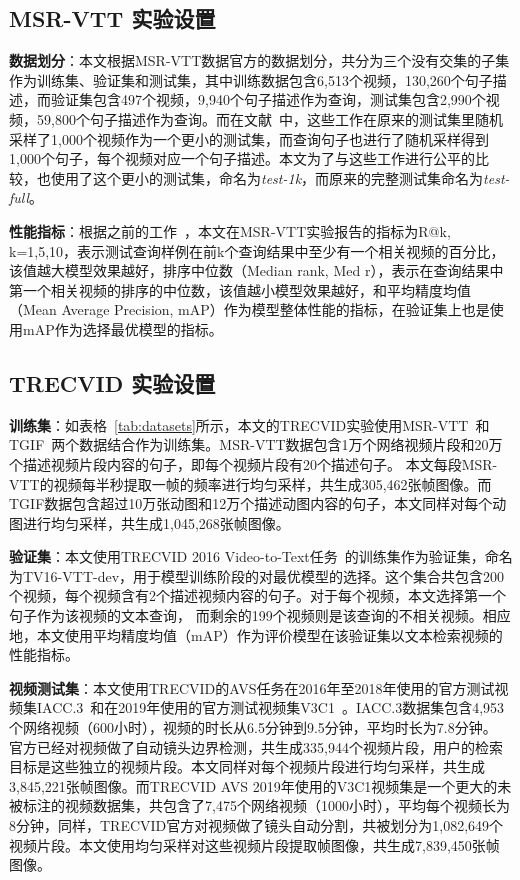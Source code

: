 

\subsection{MSR-VTT 实验设置} \label{ssec:setup-msrvtt}
\textbf{数据划分}：本文根据MSR-VTT数据官方的数据划分，共分为三个没有交集的子集作为训练集、验证集和测试集，其中训练数据包含6,513个视频，130,260个句子描述，而验证集包含497个视频，9,940个句子描述作为查询，测试集包含2,990个视频，59,800个句子描述作为查询。而在文献~\cite{}中，这些工作在原来的测试集里随机采样了1,000个视频作为一个更小的测试集，而查询句子也进行了随机采样得到1,000个句子，每个视频对应一个句子描述。本文为了与这些工作进行公平的比较，也使用了这个更小的测试集，命名为\textit{test-1k}，而原来的完整测试集命名为\textit{test-full}。

\textbf{性能指标}：根据之前的工作~\cite{}，本文在MSR-VTT实验报告的指标为R@k, k=1,5,10，表示测试查询样例在前k个查询结果中至少有一个相关视频的百分比，该值越大模型效果越好，排序中位数（Median rank, Med r），表示在查询结果中第一个相关视频的排序的中位数，该值越小模型效果越好，和平均精度均值（Mean Average Precision, mAP）作为模型整体性能的指标，在验证集上也是使用mAP作为选择最优模型的指标。

\subsection{TRECVID 实验设置} \label{ssec:setup-tv}

\textbf{训练集}：如表格~\ref{tab:datasets}所示，本文的TRECVID实验使用MSR-VTT~\cite{msrvtt}和TGIF~\cite{li2016tgif}两个数据结合作为训练集。MSR-VTT数据包含1万个网络视频片段和20万个描述视频片段内容的句子，即每个视频片段有20个描述句子。
本文每段MSR-VTT的视频每半秒提取一帧的频率进行均匀采样，共生成305,462张帧图像。而TGIF数据包含超过10万张动图和12万个描述动图内容的句子，本文同样对每个动图进行均匀采样，共生成1,045,268张帧图像。

\textbf{验证集}：本文使用TRECVID 2016 Video-to-Text任务~\cite{awad2016trecvid}的训练集作为验证集，命名为TV16-VTT-dev，用于模型训练阶段的对最优模型的选择。这个集合共包含200个视频，每个视频含有2个描述视频内容的句子。对于每个视频，本文选择第一个句子作为该视频的文本查询，
而剩余的199个视频则是该查询的不相关视频。相应地，本文使用平均精度均值（mAP）作为评价模型在该验证集以文本检索视频的性能指标。

\textbf{视频测试集}：本文使用TRECVID的AVS任务在2016年至2018年使用的官方测试视频集IACC.3~\cite{awad2016trecvid}和在2019年使用的官方测试视频集V3C1~\cite{berns2019v3c1}。IACC.3数据集包含4,953个网络视频（600小时），视频的时长从6.5分钟到9.5分钟，平均时长为7.8分钟。
官方已经对视频做了自动镜头边界检测，共生成335,944个视频片段，用户的检索目标是这些独立的视频片段。本文同样对每个视频片段进行均匀采样，共生成3,845,221张帧图像。而TRECVID AVS 2019年使用的V3C1视频集是一个更大的未被标注的视频数据集，共包含了7,475个网络视频（1000小时），平均每个视频长为8分钟，同样，TRECVID官方对视频做了镜头自动分割，共被划分为1,082,649个视频片段。本文使用均匀采样对这些视频片段提取帧图像，共生成7,839,450张帧图像。

